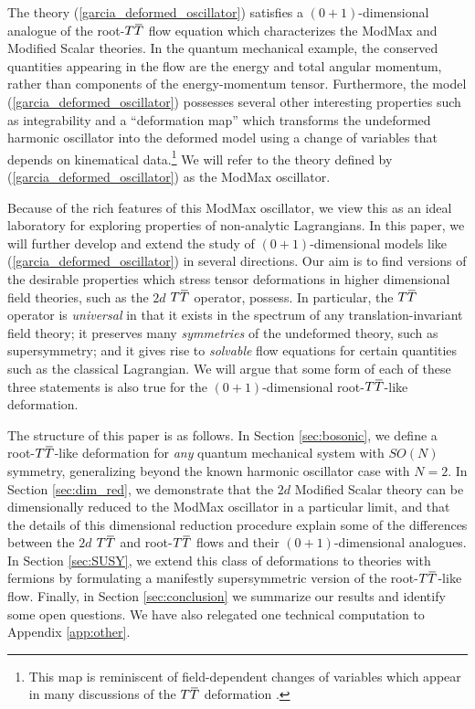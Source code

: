 \documentclass[12pt]{article}
\numberwithin{equation}{section}
\newcommand{\overbar}[1]{\mkern 1.5mu\overline{\mkern-1.5mu#1\mkern-1.5mu}\mkern 1.5mu}
\def\TT{{T\overbar{T}}}
\begin{document}
The theory (\ref{garcia_deformed_oscillator}) satisfies a $(0+1)$-dimensional analogue of the root-$\TT$ flow equation which characterizes the ModMax and Modified Scalar theories. In the quantum mechanical example, the conserved quantities appearing in the flow are the energy and total angular momentum, rather than components of the energy-momentum tensor. Furthermore, the model (\ref{garcia_deformed_oscillator}) possesses several other interesting properties such as integrability and a ``deformation map'' which transforms the undeformed harmonic oscillator into the deformed model using a change of variables that depends on kinematical data.\footnote{This map is reminiscent of field-dependent changes of variables which appear in many discussions of the $\TT$ deformation \cite{Conti:2018tca,Guica:2019nzm,Conti:2022egv}.} We will refer to the theory defined by (\ref{garcia_deformed_oscillator}) as the ModMax oscillator.

Because of the rich features of this ModMax oscillator, we view this as an ideal laboratory for exploring properties of non-analytic Lagrangians. In this paper, we will further develop and extend the study of $(0+1)$-dimensional models like (\ref{garcia_deformed_oscillator}) in several directions. Our aim is to find versions of the desirable properties which stress tensor deformations in higher dimensional field theories, such as the $2d$ $\TT$ operator, possess. In particular, the $\TT$ operator is \emph{universal} in that it exists in the spectrum of any translation-invariant field theory; it preserves many \emph{symmetries} of the undeformed theory, such as supersymmetry; and it gives rise to \emph{solvable} flow equations for certain quantities such as the classical Lagrangian. We will argue that some form of each of these three statements is also true for the $(0+1)$-dimensional root-$\TT$-like deformation.

The structure of this paper is as follows. In Section \ref{sec:bosonic}, we define a root-$\TT$-like deformation for \emph{any} quantum mechanical system with $SO(N)$ symmetry, generalizing beyond the known harmonic oscillator case with $N = 2$. In Section \ref{sec:dim_red}, we demonstrate that the $2d$ Modified Scalar theory can be dimensionally reduced to the ModMax oscillator in a particular limit, and that the details of this dimensional reduction procedure explain some of the differences between the $2d$ $\TT$ and root-$\TT$ flows and their $(0+1)$-dimensional analogues. In Section \ref{sec:SUSY}, we extend this class of deformations to theories with fermions by formulating a manifestly supersymmetric version of the root-$\TT$-like flow. Finally, in Section \ref{sec:conclusion} we summarize our results and identify some open questions. We have also relegated one technical computation to Appendix \ref{app:other}.
\end{document}
